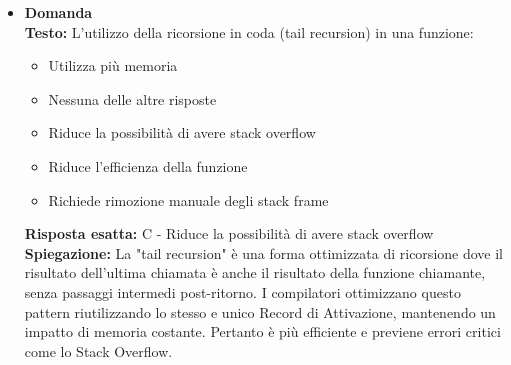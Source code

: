 \documentclass[12pt, a4paper]{article}
\newcounter{domandateoria}
\begin{document}
\begin{itemize}
    \item {}\textbf{Domanda \thedomandateoria} \\
    \textbf{Testo:} L'utilizzo della ricorsione in coda (tail recursion) in una funzione:
    \begin{itemize}
        \item[A)] Utilizza più memoria
        \item[B)] Nessuna delle altre risposte
        \item[C)] Riduce la possibilità di avere stack overflow
        \item[D)] Riduce l'efficienza della funzione
        \item[E)] Richiede rimozione manuale degli stack frame
    \end{itemize}
    \textbf{Risposta esatta:} C - Riduce la possibilità di avere stack overflow \\
    \textbf{Spiegazione:} La "tail recursion" è una forma ottimizzata di ricorsione dove il risultato dell'ultima chiamata è anche il risultato della funzione chiamante, senza passaggi intermedi post-ritorno. I compilatori ottimizzano questo pattern riutilizzando lo stesso e unico Record di Attivazione, mantenendo un impatto di memoria costante. Pertanto è più efficiente e previene errori critici come lo Stack Overflow.
    \vspace{0.3cm}
\end{itemize}
\end{document}
